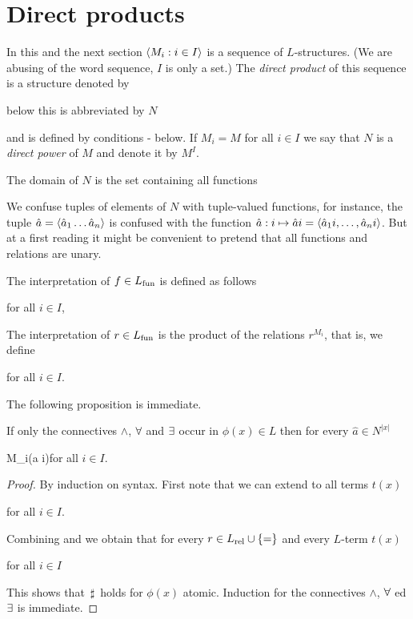 \documentclass[creche.tex]{subfiles}
\begin{document}
\section{Direct products}
\label{prodottidiretti}

In this and the next section $\langle M_i:i\in I\rangle$ is a sequence of $L$-structures. (We are abusing of the word sequence, $I$ is only a set.) The \emph{direct product\/} of this sequence is a structure denoted by

\hfill below this is abbreviated by  \emph{$N$\/}\bigskip

and is defined by conditions - below. If $M_i=M$ for all $i\in I$ we say that $N$ is a \emph{direct power\/} of $M$ and denote it by \emph{$M^I$}.

The domain of $N$ is the set containing all functions

\smallskip


We confuse tuples of elements of $N$ with tuple-valued functions, for instance, the tuple $\hat a=\langle\hat a_1\dots\hat a_n\rangle$ is confused with the function $\hat a:i\mapsto\hat ai=\langle\hat a_1i,\dots,\hat a_ni\rangle$. But at a first reading it might be convenient to pretend that all functions and relations are unary.

The interpretation of $f\in L_{\rm fun}$ is defined as follows

\hfill  for all $i\in I$,

The interpretation of $r\in L_{\rm fun}$ is the product of the relations $r^{M_i}$, that is, we define

\hfill  for all $i\in I$.


The following proposition is immediate.

\begin{proposition}\label{proposizioneprodottidiretti}
If only the connectives $\wedge$, $\forall$ and $\exists$ occur in $\phi(x)\in L$ then for every $\hat a\in N^{|x|}$

{\IFF}
{M_i\models\phi(\hat a i)}\hfill for all $i\in I$.

\end{proposition}

\begin{proof}
By induction on syntax. First note that we can extend  to all terms $t(x)$

\hfill  for all $i\in I$. 

Combining  and  we obtain that for every $r\in L_{\rm rel}\cup\{=\}$ and every $L$-term $t(x)$

\hfill  for all $i\in I$

This shows that $\,\sharp\,$ holds for $\phi(x)$ atomic. Induction for the connectives $\wedge$, $\forall$ ed $\exists$ is immediate.
\end{proof}
\end{document}
